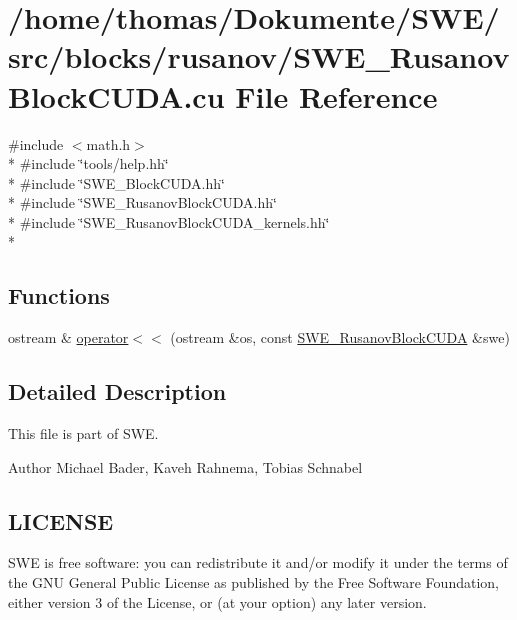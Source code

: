 \hypertarget{SWE__RusanovBlockCUDA_8cu}{\section{/home/thomas/\-Dokumente/\-S\-W\-E/src/blocks/rusanov/\-S\-W\-E\-\_\-\-Rusanov\-Block\-C\-U\-D\-A.cu File Reference}
\label{SWE__RusanovBlockCUDA_8cu}
}
{\ttfamily \#include $<$math.\-h$>$}\\*
{\ttfamily \#include \char`\"{}tools/help.\-hh\char`\"{}}\\*
{\ttfamily \#include \char`\"{}S\-W\-E\-\_\-\-Block\-C\-U\-D\-A.\-hh\char`\"{}}\\*
{\ttfamily \#include \char`\"{}S\-W\-E\-\_\-\-Rusanov\-Block\-C\-U\-D\-A.\-hh\char`\"{}}\\*
{\ttfamily \#include \char`\"{}S\-W\-E\-\_\-\-Rusanov\-Block\-C\-U\-D\-A\-\_\-kernels.\-hh\char`\"{}}\\*
\subsection*{Functions}
\begin{DoxyCompactItemize}
\item 
ostream \& \hyperlink{SWE__RusanovBlockCUDA_8cu_adbdcb6417643b695657724ea16f84954}{operator$<$$<$} (ostream \&os, const \hyperlink{classSWE__RusanovBlockCUDA}{S\-W\-E\-\_\-\-Rusanov\-Block\-C\-U\-D\-A} \&swe)
\end{DoxyCompactItemize}


\subsection{Detailed Description}
This file is part of S\-W\-E.

\begin{DoxyAuthor}{Author}
Michael Bader, Kaveh Rahnema, Tobias Schnabel
\end{DoxyAuthor}
\hypertarget{Writer_8hh_LICENSE}{}\subsection{L\-I\-C\-E\-N\-S\-E}\label{Writer_8hh_LICENSE}
S\-W\-E is free software\-: you can redistribute it and/or modify it under the terms of the G\-N\-U General Public License as published by the Free Software Foundation, either version 3 of the License, or (at your option) any later version.

